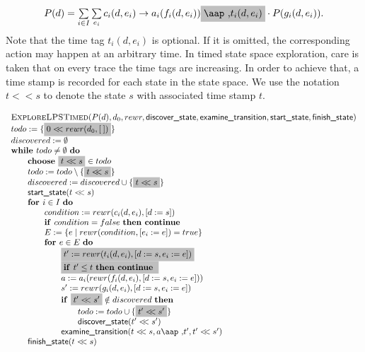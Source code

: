 \documentclass{article}
\newcommand{\at}[1]{\mbox{\aap ,} #1}
\newcommand{\aftertime}{\ensuremath{<\!\!<}}
\newcommand{\Space}{\text{\ }}
\newcommand{\If}{\text{\textbf{if }}}
\newcommand{\Do}{\text{\textbf{do }}}
\newcommand{\Then}{\text{\textbf{then }}}
\newcommand{\For}{\text{\textbf{for }}}
\newcommand{\While}{\text{\textbf{while }}}
\newcommand{\Continue}{\text{\textbf{continue }}}
\newcommand{\Choose}{\text{\textbf{choose }}}
\begin{document}
\[
\begin{array}{l}
P(d)=
\sum\limits_{i\in I}\sum\limits_{e_i}c_i(d, e_i)\rightarrow a_i(f_i(d,e_i))
\colorbox{lightgray}{$\at t_i(d,e_i)$}
\cdot P(g_i(d,e_i)).
\end{array}
\]
Note that the time tag $t_i(d,e_i)$ is optional. If it is omitted, the corresponding action may happen at an arbitrary time. In timed state space exploration, care is taken that on every trace the time tags are
increasing. In order to achieve that, a time stamp is recorded for each state
in the state space. We use the notation $t \aftertime s$ to denote the state $s$
with associated time stamp $t$.

\[
\begin{tabular}{l}
\textsc{ExploreLPSTimed}($P(d), d_0, rewr, \textsf{discover\_state}, \textsf{examine\_transition},
\textsf{start\_state}, \textsf{finish\_state})$ \\
$todo := \{\colorbox{lightgray}{$0 \aftertime rewr(d_0, [\:])$}\}$ \\
$discovered := \emptyset$ \\
$\While todo \neq \emptyset \Space \Do$ \\
\qquad \Choose \colorbox{lightgray}{$t \aftertime s$} $\in todo$ \\
\qquad $todo := todo \setminus \{ \colorbox{lightgray}{$t \aftertime s$} \}$ \\
\qquad $discovered := discovered \cup \{ \colorbox{lightgray}{$t \aftertime s$} \}$ \\
\qquad $\textsf{start\_state}(t \aftertime s)$ \\
\qquad $\For i \in I  \Space \Do$ \\
\qquad \qquad $condition := rewr(c_i(d, e_i), [d := s])$ \\
\qquad \qquad $\If condition = false  \Space \Then \Continue$ \\
\qquad \qquad $E := \{ e \mid rewr(condition, [e_i := e]) = true \}$ \\
\qquad \qquad $\For e \in E  \Space \Do$ \\
\qquad \qquad \qquad \colorbox{lightgray}{$t' := rewr(t_i(d,e_i), [d:=s,e_i:=e])$} \\
\qquad \qquad \qquad \colorbox{lightgray}{$\If t' \leq t \Space \Then \Continue$} \\
\qquad \qquad \qquad $a := a_i(rewr(f_i(d,e_i), [d:=s,e_i:=e]))$ \\
\qquad \qquad \qquad $s' := rewr(g_i(d,e_i), [d:=s,e_i:=e])$ \\
\qquad \qquad \qquad $\If \colorbox{lightgray}{$t' \aftertime s'$} \notin discovered \Space \Then$ \\
\qquad \qquad \qquad \qquad $todo := todo \cup \{ \colorbox{lightgray}{$t' \aftertime s'$} \}$ \\
\qquad \qquad \qquad \qquad $\textsf{discover\_state}( t' \aftertime s' )$ \\
\qquad \qquad \qquad $\textsf{examine\_transition}(t \aftertime s, a \at t', t' \aftertime s')$ \\
\qquad $\textsf{finish\_state}(t \aftertime s)$ \\
\end{tabular}
\]
\end{document}
